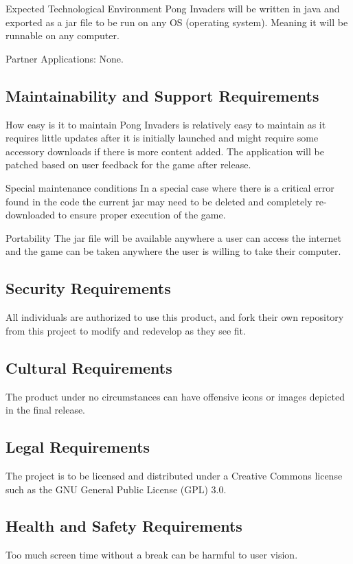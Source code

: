 \documentclass[12pt, titlepage]{article}
\begin{document}
Expected Technological Environment
Pong Invaders will be written in java and exported as a jar file to be run on any OS (operating system). Meaning it will be runnable on any computer.

Partner Applications:
None.


\subsection{Maintainability and Support Requirements}
How easy is it to maintain
Pong Invaders is relatively easy to maintain as it requires little updates after it is initially launched and might require some accessory downloads if there is more content added. The application will be patched based on user feedback for the game after release.
 
Special maintenance conditions
In a special case where there is a critical error found in the code the current jar may need to be deleted and completely re-downloaded to ensure proper execution of the game.
 
Portability
The jar file will be available anywhere a user can access the internet and the game can be taken anywhere the user is willing to take their computer. 

\subsection{Security Requirements}
All individuals are authorized to use this product, and fork their own repository from this project to modify and redevelop as they see fit.

\subsection{Cultural Requirements}
The product under no circumstances can have offensive icons or images depicted in the final release.

\subsection{Legal Requirements}
The project is to be licensed and distributed under a Creative Commons license such as the GNU General Public License (GPL) 3.0.

\subsection{Health and Safety Requirements}
Too much screen time without a break can be harmful to user vision. 
\end{document}
